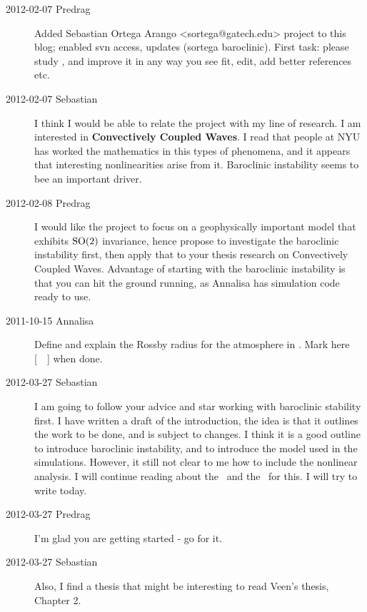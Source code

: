 \begin{description}

\item[2012-02-07 Predrag] Added Sebastian Ortega Arango
<sortega@gatech.edu> project to this blog; enabled svn access, updates
(sortega  baroclinic). First task: please study ,
and improve it in any way you see fit, edit, add better references etc.

\item[2012-02-07 Sebastian]
I think I would be able to relate the project with my line of research. I
am interested in \textbf{Convectively Coupled Waves}. I read that people at NYU
has worked the mathematics in this types of phenomena, and it appears
that interesting nonlinearities arise from it. Baroclinic instability
seems to bee an important driver.

\item[2012-02-08 Predrag] I would like the project to focus on a
geophysically important model that exhibits $\textrm{SO}(2)$ invariance,
hence propose to investigate the baroclinic instability first, then apply
that to your thesis research on Convectively Coupled Waves. Advantage of
starting with the baroclinic instability is that you can hit the ground running,
as Annalisa has simulation code ready to use.

\item[2011-10-15 Annalisa] Define and explain the Rossby radius for the
atmosphere in . Mark here [~~] when done.

\item[2012-03-27 Sebastian] I am going to follow your advice and star
working with baroclinic stability first. I have written a draft of the
introduction, the idea is that it outlines the work to be done, and is
subject to changes. I think it is a good outline to introduce baroclinic
instability, and to introduce the model used in the simulations. However,
it still not clear to me how to include the nonlinear analysis. I will
continue reading about the \KSe\ and the \pCf\ for this. I will try to
write  today.

\item[2012-03-27 Predrag] I'm glad you are getting started - go for it.

\item[2012-03-27 Sebastian]
Also, I find a thesis that might be interesting to read Veen's thesis,
{Chapter 2}.


\end{description}
